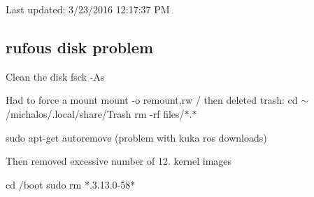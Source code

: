 Last updated\-: 3/23/2016 12\-:17\-:37 P\-M

\subsection*{rufous disk problem }

Clean the disk fsck -\/\-As

Had to force a mount mount -\/o remount,rw / then deleted trash\-: cd $\sim$/michalos/.local/share/\-Trash rm -\/rf files/$\ast$.$\ast$

sudo apt-\/get autoremove (problem with kuka ros downloads)

Then removed excessive number of 12. kernel images \begin{DoxyVerb}cd /boot
sudo rm *.3.13.0-58*\end{DoxyVerb}
 